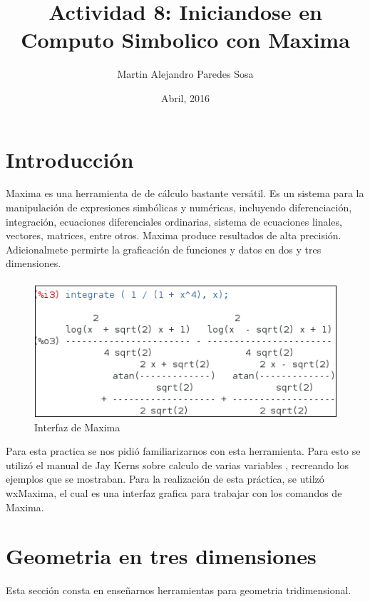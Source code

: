 \documentclass[12pt]{article}
\title{Actividad 8: Iniciandose en Computo Simbolico con Maxima}
\author{Martin Alejandro Paredes Sosa}
\date{Abril, 2016}
\begin{document}
\maketitle

\section{Introducción}
Maxima es una herramienta de de cálculo bastante versátil. Es un sistema para la manipulación de expresiones simbólicas y numéricas, incluyendo diferenciación, integración, ecuaciones diferenciales ordinarias, sistema de ecuaciones linales, vectores, matrices, entre otros. Maxima produce resultados de alta precisión. Adicionalmete permirte la graficación de funciones y datos en dos y tres dimensiones. \cite{M}

\begin{figure}[H]
\centering
\includegraphics[scale=1]{maxi.png}
\caption{Interfaz de Maxima}
\end{figure}

\hspace{0.5cm} Para esta practica se nos pidió familiarizarnos con esta herramienta. Para esto se utilizó el manual de Jay Kerns sobre calculo de varias variables \cite{JK}, recreando los ejemplos que se mostraban. Para la realización de esta práctica, se utilzó wxMaxima, el cual es una interfaz grafica para trabajar con los comandos de Maxima.


\pagebreak


\section{Geometria en tres dimensiones}
Esta sección consta en enseñarnos herramientas para geometria tridimensional.
\end{document}
